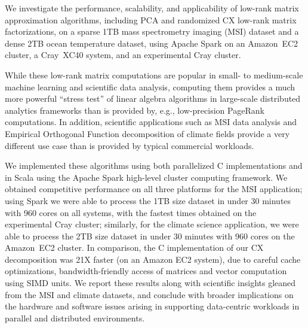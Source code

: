 We investigate the performance, scalability, and applicability of low-rank
matrix approximation algorithms, including PCA and randomized CX low-rank
matrix factorizations, on a sparse 1TB mass spectrometry imaging (MSI) dataset
and a dense 2TB ocean temperature dataset, using Apache Spark on an Amazon~EC2
cluster, a Cray~XC40 system, and an experimental Cray cluster.

While these low-rank matrix computations are popular in small- to medium-scale
machine learning and scientific data analysis, computing them provides a much
more powerful ``stress test'' of linear algebra algorithms in large-scale
distributed analytics frameworks than is provided by, e.g., low-precision
PageRank computations. In addition, scientific applications such as MSI data
analysis and Empirical Orthogonal Function decomposition of climate fields
provide a very different use case than is provided by typical commercial
workloads.

We implemented these algorithms using both parallelized C
implementations and in Scala using the Apache Spark high-level cluster
computing framework. We obtained competitive performance on all three platforms
for the MSI application; using Spark we were able to process the 1TB size
dataset in under 30 minutes with 960 cores on all systems, with the fastest
times obtained on the experimental Cray cluster; similarly, for the climate
science application, we were able to process the 2TB size dataset in under 30
minutes with 960 cores on the Amazon~EC2 cluster. In comparison, the C
implementation of our CX decomposition was 21X faster (on an Amazon EC2
system), due to careful cache optimizations, bandwidth-friendly access of
matrices and vector computation using SIMD units. 
We report these results along with scientific insights gleaned from the
MSI and climate datasets, and conclude with broader implications on the
hardware and software issues arising in supporting data-centric workloads in
parallel and distributed environments.
